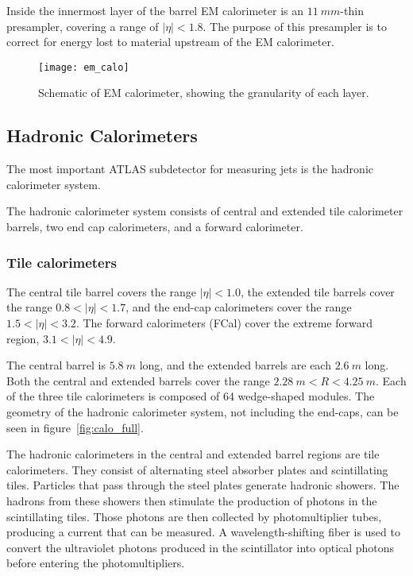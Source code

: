Inside the innermost layer of the barrel EM calorimeter is an $11~mm$-thin presampler, covering a range of $|\eta| < 1.8$.
The purpose of this presampler is to correct for energy lost to material upstream of the EM calorimeter.

\begin{figure}[!ht]\centering
\texttt{[image: em\_calo]}
\caption{Schematic of EM calorimeter, showing the granularity of each layer.}
\label{fig:em_calo}\cite{em-calo}
\end{figure}

\subsection{Hadronic Calorimeters}\label{subsec:had_cal}

The most important ATLAS subdetector for measuring jets is the hadronic calorimeter system.

The hadronic calorimeter system consists of central and extended tile calorimeter barrels, two end cap calorimeters,
and a forward calorimeter.

\subsubsection{Tile calorimeters}

The central tile barrel covers the range $|\eta|<1.0$, the extended tile barrels cover the range $0.8 < |\eta| < 1.7$,
and the end-cap calorimeters cover the range $1.5 < |\eta| < 3.2$.
The forward calorimeters (FCal) cover the extreme forward region, $3.1 < |\eta| < 4.9$.

The central barrel is $5.8~m$ long, and the extended barrels are each $2.6~m$ long.
Both the central and extended barrels cover the range $2.28~m < R < 4.25~m$.
Each of the three tile calorimeters is composed of 64 wedge-shaped modules.
The geometry of the hadronic calorimeter system, not including the end-caps, can be seen in figure~\ref{fig:calo_full}.

The hadronic calorimeters in the central and extended barrel regions are tile calorimeters.
They consist of alternating steel absorber plates and scintillating tiles.
Particles that pass through the steel plates generate hadronic showers.
The hadrons from these showers then stimulate the production of photons in the scintillating tiles.
Those photons are then collected by photomultiplier tubes, producing a current that can be measured.
A wavelength-shifting fiber is used to convert the ultraviolet photons produced in the scintillator into optical photons
before entering the photomultipliers.

